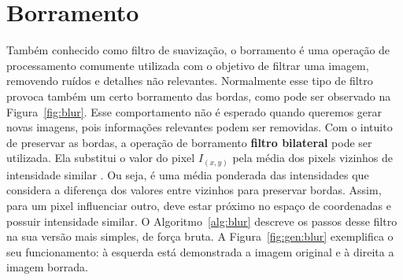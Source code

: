 
%

\section{Borramento}

Também conhecido como filtro de suavização, o borramento é uma operação de processamento comumente utilizada com o objetivo de filtrar uma imagem, removendo ruídos e detalhes não relevantes. Normalmente esse tipo de filtro provoca também um certo borramento das bordas, como pode ser observado na Figura~\ref{fig:blur}. Esse comportamento não é esperado quando queremos gerar novas imagens, pois informações relevantes podem ser removidas. Com o intuito de preservar as bordas, a operação de borramento \textbf{filtro bilateral} pode ser utilizada. Ela substitui o valor do pixel $I_(x,y)$ pela média dos pixels vizinhos de intensidade similar \cite{Tomasi1998}. Ou seja, é uma média ponderada das intensidades que considera a diferença dos valores entre vizinhos para preservar bordas. Assim, para um pixel influenciar outro, deve estar próximo no espaço de coordenadas e possuir intensidade similar. O Algoritmo~\ref{alg:blur} descreve os passos desse filtro na sua versão mais simples, de força bruta. A Figura~\ref{fig:gen:blur} exemplifica o seu funcionamento: à esquerda está demonstrada a imagem original e à direita a imagem borrada.

